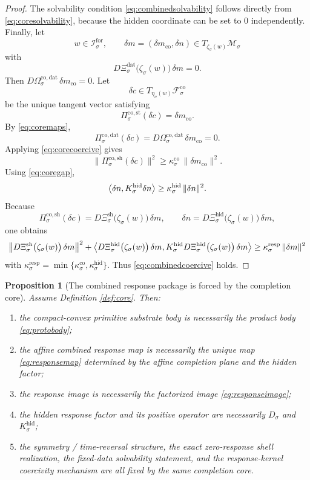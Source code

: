 \documentclass[11pt]{article}
\newcommand{\ForSpace}[1]{\mathcal I_{#1}^{\mathrm{for}}}
\newcommand{\ProtoSpace}[1]{\mathcal M_{#1}}
\newcommand{\ResponseData}[1]{\Xi_{#1}^{\mathrm{dat}}}
\newcommand{\ResponseShell}[1]{\Xi_{#1}^{\mathrm{sh}}}
\newcommand{\ResponseHidden}[1]{\Xi_{#1}^{\mathrm{hid}}}
\newcommand{\GapBody}[1]{D_{#1}}
\newcommand{\HiddenOperator}[1]{K_{#1}^{\mathrm{hid}}}
\newcommand{\ProtoEmbed}[1]{\zeta_{#1}}
\newcommand{\CoreAffine}[1]{\mathcal F_{#1}^{\mathrm{co}}}
\newcommand{\CoreStateProj}[1]{\Pi_{#1}^{\mathrm{co,st}}}
\newcommand{\CoreDataProj}[1]{\Pi_{#1}^{\mathrm{co,dat}}}
\newcommand{\CoreShellProj}[1]{\Pi_{#1}^{\mathrm{co,sh}}}
\newcommand{\CoreDataMap}[1]{\Omega_{#1}^{\mathrm{co,dat}}}
\newcommand{\CoreEmbed}[1]{\eta_{#1}}
\newtheorem{proposition}{Proposition}
\begin{document}
\begin{proof}
The solvability condition \eqref{eq:combinedsolvability} follows directly from \eqref{eq:coresolvability}, because the hidden coordinate can be set to \(0\) independently. Finally, let
\[
w\in\ForSpace{\sigma},
\qquad
\delta m=(\delta m_{\mathrm{co}},\delta n)\in
T_{\ProtoEmbed{\sigma}(w)}\ProtoSpace{\sigma}
\]
with
\[
D\ResponseData{\sigma}\bigl(\ProtoEmbed{\sigma}(w)\bigr)\,\delta m=0.
\]
Then \(D\CoreDataMap{\sigma}\,\delta m_{\mathrm{co}}=0\). Let
\[
\delta c\in T_{\CoreEmbed{\sigma}(w)}\CoreAffine{\sigma}
\]
be the unique tangent vector satisfying
\[
\CoreStateProj{\sigma}(\delta c)=\delta m_{\mathrm{co}}.
\]
By \eqref{eq:coremaps},
\[
\CoreDataProj{\sigma}(\delta c)
=
D\CoreDataMap{\sigma}\,\delta m_{\mathrm{co}}
=
0.
\]
Applying \eqref{eq:corecoercive} gives
\[
\|\CoreShellProj{\sigma}(\delta c)\|^{2}
\ge
\kappa_{\sigma}^{\mathrm{co}}\,
\|\delta m_{\mathrm{co}}\|^{2}.
\]
Using \eqref{eq:coregap},
\[
\ev{\delta n,\HiddenOperator{\sigma}\delta n}
\ge
\kappa_{\sigma}^{\mathrm{hid}}\,
\|\delta n\|^{2}.
\]
Because
\[
\CoreShellProj{\sigma}(\delta c)
=
D\ResponseShell{\sigma}\bigl(\ProtoEmbed{\sigma}(w)\bigr)\,\delta m,
\qquad
\delta n
=
D\ResponseHidden{\sigma}\bigl(\ProtoEmbed{\sigma}(w)\bigr)\,\delta m,
\]
one obtains
\[
\bigl\|
D\ResponseShell{\sigma}\bigl(\ProtoEmbed{\sigma}(w)\bigr)\,\delta m
\bigr\|^{2}
+
\ev{
D\ResponseHidden{\sigma}\bigl(\ProtoEmbed{\sigma}(w)\bigr)\,\delta m,
\HiddenOperator{\sigma}
D\ResponseHidden{\sigma}\bigl(\ProtoEmbed{\sigma}(w)\bigr)\,\delta m
}
\ge
\kappa_{\sigma}^{\mathrm{resp}}\,
\|\delta m\|^{2}
\]
with \(\kappa_{\sigma}^{\mathrm{resp}}=\min\{\kappa_{\sigma}^{\mathrm{co}},\kappa_{\sigma}^{\mathrm{hid}}\}\). Thus \eqref{eq:combinedcoercive} holds.
\end{proof}

\begin{proposition}[The combined response package is forced by the completion core]
\label{prop:forcedcombined}
Assume Definition \ref{def:core}. Then:
\begin{enumerate}
    \item the compact-convex primitive substrate body is necessarily the product body \eqref{eq:protobody};
    \item the affine combined response map is necessarily the unique map \eqref{eq:responsemap} determined by the affine completion plane and the hidden factor;
    \item the response image is necessarily the factorized image \eqref{eq:responseimage};
    \item the hidden response factor and its positive operator are necessarily \(\GapBody{\sigma}\) and \(\HiddenOperator{\sigma}\);
    \item the symmetry / time-reversal structure, the exact zero-response shell realization, the fixed-data solvability statement, and the response-kernel coercivity mechanism are all fixed by the same completion core.
\end{enumerate}
\end{proposition}
\end{document}
